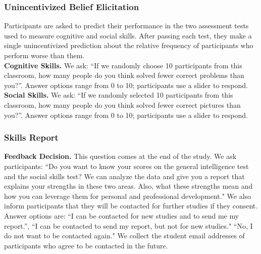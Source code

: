 \documentclass[11pt,a4paper,oneside]{article}
\begin{document}
\subsubsection{Unincentivized Belief Elicitation}
Participants are asked to predict their performance in the two assessment tests used to measure cognitive and social skills. After passing each test, they make a single unincentivized prediction about the relative frequency of participants who perform worse than them.\medskip\\
\textbf{Cognitive Skills.} We ask: ``If we randomly choose 10 participants from this classroom, how many people do you think solved fewer correct problems than you?''. Answer options range from 0 to 10; participants use a slider to respond.\medskip\\
\textbf{Social Skills.} We ask: ``If we randomly selected 10 participants from this classroom, how many people do you think solved fewer correct pictures than you?''. Answer options range from 0 to 10; participants use a slider to respond.

\subsubsection{Skills Report}
\textbf{Feedback Decision.} This question comes at the end of the study. We ask participants: ``Do you want to know your scores on the general intelligence test and the social skills test? We can analyze the data and give you a report that explains your strengths in these two areas. Also, what these strengths mean and how you can leverage them for personal and professional development." We also inform participants that they will be contacted for further studies if they consent. Answer options are: ``I can be contacted for new studies and to send me my report.'', ``I can be contacted to send my report, but not for new studies." ``No, I do not want to be contacted again." We collect the student email addresses of participants who agree to be contacted in the future.
\end{document}
